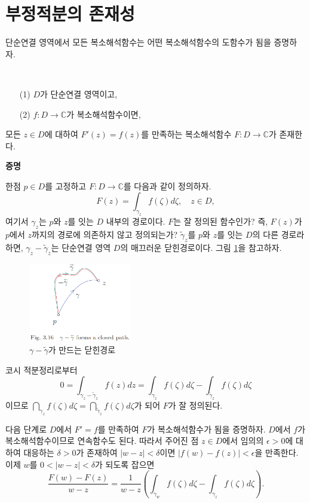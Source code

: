 \section{부정적분의 존재성}

단순연결 영역에서 모든 복소해석함수는 어떤 복소해석함수의 도함수가 됨을 증명하자.

\begin{salt_theorem} \label{thm-3-5}
\
\begin{itemize}
\item[(1)] $D$가 단순연결 영역이고,
\item[(2)] $f:D\to\mathbb C$가 복소해석함수이면,
\end{itemize}
모든 $z\in D$에 대하여 $F'(z) = f(z)$를 만족하는 
복소해석함수 $F:D\to\mathbb C$가 존재한다.
\end{salt_theorem}

{\bf 증명}

한점 $p\in D$를 고정하고 $F:D\to\mathbb C$를 다음과 같이 정의하자.
\[
F(z) = \int_{\gamma_z} f(\zeta)d\zeta, \quad z\in D,
\]
여기서 $\gamma_z$는 $p$와 $z$를 잇는 $D$ 내부의 경로이다.
$F$는 잘 정의된 함수인가? 즉, $F(z)$가 $p$에서 $z$까지의 경로에
의존하지 않고 정의되는가?
$\tilde \gamma_z$를 $p$와 $z$를 잇는 $D$의 다른 경로라 하면,
$\gamma_z - \tilde\gamma_z$는 단순연결 영역 $D$의
매끄러운 닫힌경로이다. 그림 \ref{fig-3-16}을 참고하자.

\begin{figure}[!h]
\begin{center}
\includegraphics[width=0.4\textwidth]{./SaltChapter/fig-3-16}
\end{center}
\caption{$\gamma - \tilde \gamma$가 만드는 닫힌경로}
\label{fig-3-16}
\end{figure}

코시 적분정리로부터 
\[
0 = \int_{\gamma_z - \tilde\gamma_z}f(z)dz 
= \int_{\gamma_z} f(\zeta)d\zeta 
- \int_{\tilde\gamma_z} f(\zeta)d\zeta 
\]
이므로 $\dint_{\gamma_z}f(\zeta)d\zeta = \dint_{\tilde\gamma_z} f(\zeta)d\zeta$가 되어 
$F$가 잘 정의된다.

다음 단계로 $D$에서 $F'=f$를 만족하여 $F$가 복소해석함수가 됨을 증명하자.
$D$에서 $f$가 복소해석함수이므로
연속함수도 된다. 
따라서 주어진 점 $z\in D$에서 임의의 $\epsilon>0$에 대하여
대응하는 $\delta>0$가 존재하여
$|w-z|<\delta$이면 $|f(w)-f(z)|<\epsilon$을 만족한다.
이제 $w$를 $0<|w-z|<\delta$가 되도록 잡으면
\[
\dfrac{F(w)-F(z)}{w-z} = \dfrac1{w-z} \left(
\int_{\gamma_w} f(\zeta)d\zeta - \int_{\gamma_z} f(\zeta)d\zeta \right).
\]

